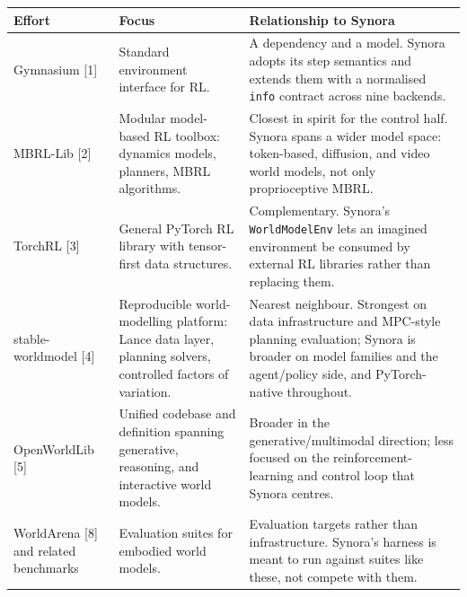 \documentclass[10pt,a4paper]{article}
\begin{document}
{\footnotesize
\begin{tabular}{@{}p{}p{}p{}@{}}
\toprule
\textbf{Effort} & \textbf{Focus} & \textbf{Relationship to Synora}\\
\midrule
Gymnasium [1] & Standard environment interface for RL. & A dependency and a model. Synora adopts its step semantics and extends them with a normalised \texttt{info} contract across nine backends.\\[1.4mm]
MBRL-Lib [2] & Modular model-based RL toolbox: dynamics models, planners, MBRL algorithms. & Closest in spirit for the control half. Synora spans a wider model space: token-based, diffusion, and video world models, not only proprioceptive MBRL.\\[1.4mm]
TorchRL [3] & General PyTorch RL library with tensor-first data structures. & Complementary. Synora's \texttt{WorldModelEnv} lets an imagined environment be consumed by external RL libraries rather than replacing them.\\[1.4mm]
stable-worldmodel [4] & Reproducible world-modelling platform: Lance data layer, planning solvers, controlled factors of variation. & Nearest neighbour. Strongest on data infrastructure and MPC-style planning evaluation; Synora is broader on model families and the agent/policy side, and PyTorch-native throughout.\\[1.4mm]
OpenWorldLib [5] & Unified codebase and definition spanning generative, reasoning, and interactive world models. & Broader in the generative/multimodal direction; less focused on the reinforcement-learning and control loop that Synora centres.\\[1.4mm]
WorldArena [8] and related benchmarks & Evaluation suites for embodied world models. & Evaluation targets rather than infrastructure. Synora's harness is meant to run against suites like these, not compete with them.\\
\bottomrule
\end{tabular}}
\end{document}
